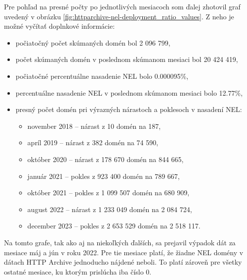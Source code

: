 Pre pohľad na presné počty po jednotlivých mesiacoch som ďalej zhotovil graf uvedený v obrázku \ref{fig:httparchive-nel-deployment_ratio_values}.
Z neho je možné vyčítať doplnkové informácie:
\begin{itemize}
    \item počiatočný počet skúmaných domén bol 2 096 799, 
    \item počet skúmaných domén v poslednom skúmanom mesiaci bol 20 424 419,
    \item počiatočné percentuálne nasadenie NEL bolo 0.000095\%,
    \item percentuálne nasadenie NEL v poslednom skúmanom mesiaci bolo 12.77\%,
    \item presný počet domén pri výrazných nárastoch a poklesoch v nasadení NEL:
    \begin{itemize}
        \item november 2018 -- nárast z 10 domén na 187,
        \item apríl 2019 -- nárast z 382 domén na 74 590,
        \item október 2020 -- nárast z 178 670 domén na 844 665,
        \item január 2021 -- pokles z 923 400 domén na 789 667,
        \item október 2021 -- pokles z 1 099 507 domén na 680 909,
        \item august 2022 -- nárast z 1 233 049 domén na 2 084 724,
        \item december 2023 -- pokles z 2 653 529 domén na 2 518 117.
    \end{itemize}
\end{itemize}

Na tomto grafe, tak ako aj na niekoľkých ďalších, sa prejavil výpadok dát za mesiace máj a jún v roku 2022.
Pre tie mesiace platí, že žiadne NEL domény v dátach HTTP Archive jednoducho nájdené neboli. 
To platí zároveň pre všetky ostatné mesiace, ku ktorým prislúcha iba číslo 0.

